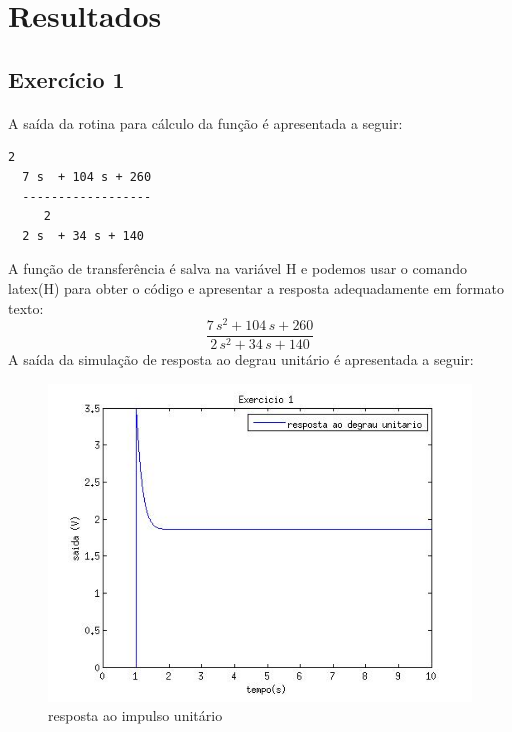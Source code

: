 \documentclass[a4paper,11pt]{article}
\begin{document}
\FloatBarrier
 \newpage
\section{Resultados}

	\subsection{Exercício 1}
		\paragraph{} A saída da rotina para cálculo da função 
é apresentada a seguir:
	\begin{lstlisting}[frame=single]
     2
  7 s  + 104 s + 260
  ------------------
     2
  2 s  + 34 s + 140
	\end{lstlisting}
A função de transferência é salva na variável H e podemos usar
o comando latex(H) para obter o código e apresentar a resposta
adequadamente em formato texto:
\begin{equation}
\frac{7\, s^2 + 104\, s + 260}{2\, s^2 + 34\, s + 140}
\end{equation}
A saída da simulação de resposta ao degrau unitário é 
apresentada a seguir:
\begin{figure}[!htp]
		\centering
		\includegraphics[scale = 0.5]{./images/exerc1-saida.jpg}
		\caption{resposta ao impulso unitário}
		\label{fig:circuit1}
\end{figure}
\end{document}

